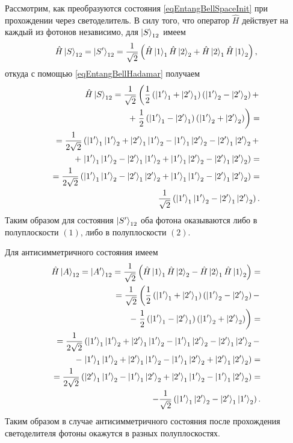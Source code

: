 


Рассмотрим, как преобразуются состояния \eqref{eqEntangBellSpaceInit}
при прохождении через светоделитель. В силу того, что оператор
$\hat{H}$ действует на каждый из фотонов независимо, для
$\ket{S}_{12}$ имеем 
\begin{equation}
\hat{H}\ket{S}_{12} = \ket{S'}_{12} = 
\frac{1}{\sqrt{2}}
\left(
\hat{H}\ket{1}_1\hat{H}\ket{2}_2 +
\hat{H}\ket{2}_1\hat{H}\ket{1}_2
\right),
\nonumber 
\end{equation}
откуда с помощью \eqref{eqEntangBellHadamar} получаем
\begin{eqnarray}
\hat{H}\ket{S}_{12} =
\frac{1}{\sqrt{2}}
\left(
\frac{1}{2}
\left(\ket{1'}_1 +
\ket{2'}_1\right)
\left(\ket{1'}_2 -
\ket{2'}_2\right) +
\right.
\nonumber \\
+ \left.
\frac{1}{2}
\left(\ket{1'}_1 -
\ket{2'}_1\right)
\left(\ket{1'}_2 +
\ket{2'}_2\right)
\right) = 
\nonumber \\
=
\frac{1}{2 \sqrt{2}}
\left(
\ket{1'}_1 \ket{1'}_2 +
\ket{2'}_1 \ket{1'}_2 -
\ket{1'}_1 \ket{2'}_2 -
\ket{2'}_1 \ket{2'}_2 +
\right. 
\nonumber \\
+ \left.
\ket{1'}_1 \ket{1'}_2 -
\ket{2'}_1 \ket{1'}_2 +
\ket{1'}_1 \ket{2'}_2 -
\ket{2'}_1 \ket{2'}_2
\right) =
\nonumber \\
=
\frac{1}{2 \sqrt{2}}
\left(
\ket{1'}_1 \ket{1'}_2 
- \ket{2'}_1 \ket{2'}_2 
+ \ket{1'}_1 \ket{1'}_2 
- \ket{2'}_1 \ket{2'}_2
\right) = 
\nonumber \\
\frac{1}{\sqrt{2}}
\left(
\ket{1'}_1 \ket{1'}_2 
- \ket{2'}_1 \ket{2'}_2 
\right).
\nonumber
\end{eqnarray}
Таким образом для состояния $\ket{S'}_{12}$ оба фотона оказываются
либо в полуплоскости $\left(1\right)$, либо в полуплоскости
$\left(2\right)$. 

Для антисимметричного состояния имеем
\begin{eqnarray}
\hat{H}\ket{A}_{12} = \ket{A'}_{12} = 
\frac{1}{\sqrt{2}}
\left(
\hat{H}\ket{1}_1\hat{H}\ket{2}_2 -
\hat{H}\ket{2}_1\hat{H}\ket{1}_2
\right) = 
\nonumber \\
=
\frac{1}{\sqrt{2}}
\left(
\frac{1}{2}
\left(\ket{1'}_1 +
\ket{2'}_1\right)
\left(\ket{1'}_2 -
\ket{2'}_2\right) -
\right.
\nonumber \\
- \left.
\frac{1}{2}
\left(\ket{1'}_1 -
\ket{2'}_1\right)
\left(\ket{1'}_2 +
\ket{2'}_2\right)
\right) = 
\nonumber \\
=
\frac{1}{2 \sqrt{2}}
\left(
\ket{1'}_1 \ket{1'}_2 +
\ket{2'}_1 \ket{1'}_2 -
\ket{1'}_1 \ket{2'}_2 -
\ket{2'}_1 \ket{2'}_2 -
\right. 
\nonumber \\
- \left.
\ket{1'}_1 \ket{1'}_2 +
\ket{2'}_1 \ket{1'}_2 -
\ket{1'}_1 \ket{2'}_2 +
\ket{2'}_1 \ket{2'}_2
\right) =
\nonumber \\
=
\frac{1}{2 \sqrt{2}}
\left(
\ket{2'}_1 \ket{1'}_2 
- \ket{1'}_1 \ket{2'}_2 
+ \ket{2'}_1 \ket{1'}_2 
- \ket{1'}_1 \ket{2'}_2
\right) = 
\nonumber \\
- \frac{1}{\sqrt{2}}
\left(
\ket{1'}_1 \ket{2'}_2 
- \ket{2'}_1 \ket{1'}_2 
\right).
\nonumber
\end{eqnarray}
Таким образом в случае антисимметричного состояния после прохождения
светоделителя фотоны окажутся в разных полуплоскостях.

